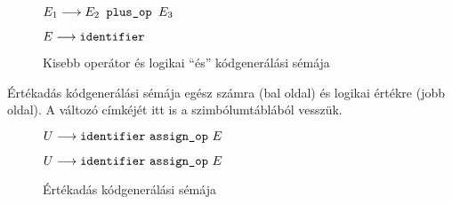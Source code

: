 \begin{figure}[h]
	\begin{minipage}{0.5\linewidth}
		\begin{stuki*}[5cm]{$E_1 \longrightarrow E_2 \texttt{ plus\_op } E_3$}
		\end{stuki*}
	\end{minipage}
	\begin{minipage}{0.5\linewidth}
		\begin{stuki*}[5cm]{$E \longrightarrow \texttt{identifier}$}
		\end{stuki*}
	\end{minipage}
	\caption{Kisebb operátor és logikai ``és'' kódgenerálási sémája}
\end{figure}

\pagebreak

Értékadás kódgenerálási sémája egész számra (bal oldal) és logikai értékre (jobb oldal). A változó címkéjét itt is a szimbólumtáblából vesszük.

\begin{figure}[h]
	\begin{minipage}{0.5\linewidth}
		\begin{stuki*}[5cm]{$U \longrightarrow  \texttt{identifier} ~ \texttt{assign\_op} ~ E$}
		\end{stuki*}
	\end{minipage}
	\begin{minipage}{0.5\linewidth}
		\begin{stuki*}[5cm]{$U \longrightarrow  \texttt{identifier} ~ \texttt{assign\_op} ~ E$}
		\end{stuki*}
	\end{minipage}
	\caption{Értékadás kódgenerálási sémája}
\end{figure}

